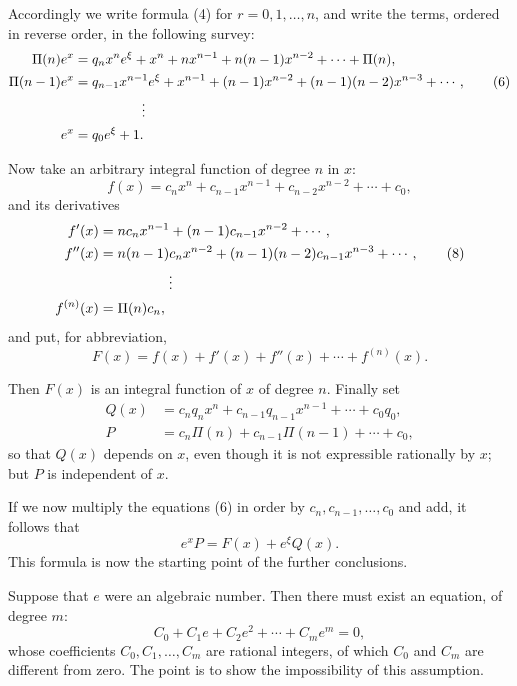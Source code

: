 \documentclass[11pt]{article}
\begin{document}
Accordingly we write formula (4) for $r=0,1,\ldots,n$, and write the terms, ordered in reverse order, in the following survey:
\begin{align}
\Pi(n)e^x&=q_nx^n e^\xi+x^n+nx^{n-1}+n(n-1)x^{n-2}+\cdots+\Pi(n),\notag\\
\Pi(n-1)e^x&=q_{n-1}x^{n-1}e^\xi+x^{n-1}+(n-1)x^{n-2}
 +(n-1)(n-2)x^{n-3}+\cdots,\tag{6}\\
&\hspace{5em}\vdots\notag\\
e^x&=q_0e^\xi+1.\notag
\end{align}

Now take an arbitrary integral function of degree $n$ in $x$:
\begin{equation}\tag{7}
f(x)=c_nx^n+c_{n-1}x^{n-1}+c_{n-2}x^{n-2}+\cdots+c_0,
\end{equation}
and its derivatives
\begin{align}
f'(x)&=nc_nx^{n-1}+(n-1)c_{n-1}x^{n-2}+\cdots,\\
f''(x)&=n(n-1)c_nx^{n-2}+(n-1)(n-2)c_{n-1}x^{n-3}+\cdots,\tag{8}\\
&\hspace{5em}\vdots\notag\\
f^{(n)}(x)&=\Pi(n)c_n,\notag
\end{align}
and put, for abbreviation,
\begin{equation}\tag{9}
F(x)=f(x)+f'(x)+f''(x)+\cdots+f^{(n)}(x).
\end{equation}

Then $F(x)$ is an integral function of $x$ of degree $n$. Finally set
\begin{align}
Q(x)&=c_nq_nx^n+c_{n-1}q_{n-1}x^{n-1}+\cdots+c_0q_0,\tag{10}\\
P&=c_n\Pi(n)+c_{n-1}\Pi(n-1)+\cdots+c_0,\tag{11}
\end{align}
so that $Q(x)$ depends on $x$, even though it is not expressible rationally by $x$; but $P$ is independent of $x$.

If we now multiply the equations (6) in order by $c_n,c_{n-1},\ldots,c_0$ and add, it follows that
\begin{equation}\tag{12}
e^xP=F(x)+e^\xi Q(x).
\end{equation}
This formula is now the starting point of the further conclusions.

Suppose that $e$ were an algebraic number. Then there must exist an equation, of degree $m$:
\begin{equation}\tag{13}
C_0+C_1e+C_2e^2+\cdots+C_me^m=0,
\end{equation}
whose coefficients $C_0,C_1,\ldots,C_m$ are rational integers, of which $C_0$ and $C_m$ are different from zero. The point is to show the impossibility of this assumption.
\end{document}

